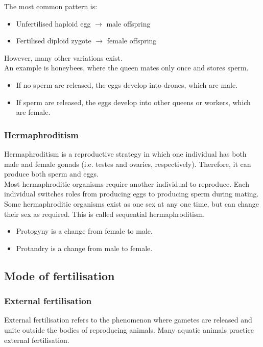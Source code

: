 \documentclass[11pt]{article}
\begin{document}
The most common pattern is:
\begin{itemize}
\item Unfertilised haploid egg \(\rightarrow\) male offspring
\item Fertilised diploid zygote \(\rightarrow\) female offspring
\end{itemize}

However, many other variations exist.
\\[0pt]

An example is honeybees, where the queen mates only once and stores sperm.
\begin{itemize}
\item If no sperm are released, the eggs develop into drones, which are male.
\item If sperm are released, the eggs develop into other queens or workers, which are female.
\end{itemize}


\subsubsection{Hermaphroditism}
\label{sec:org0511982}
Hermaphroditism is a reproductive strategy in which one individual has both male and female gonads (i.e. testes and ovaries, respectively). Therefore, it can produce both sperm and eggs.
\\[0pt]

Most hermaphroditic organisms require another individual to reproduce. Each individual switches roles from producing eggs to producing sperm during mating.
\\[0pt]

Some hermaphroditic organisms exist as one sex at any one time, but can change their sex as required. This is called sequential hermaphroditism.
\begin{itemize}
\item Protogyny is a change from female to male.
\item Protandry is a change from male to female.
\end{itemize}

\subsection{Mode of fertilisation}
\label{sec:org250f577}

\subsubsection{External fertilisation}
\label{sec:org7f539be}
External fertilisation refers to the phenomenon where gametes are released and unite outside the bodies of reproducing animals. Many aquatic animals practice external fertilisation.
\end{document}
